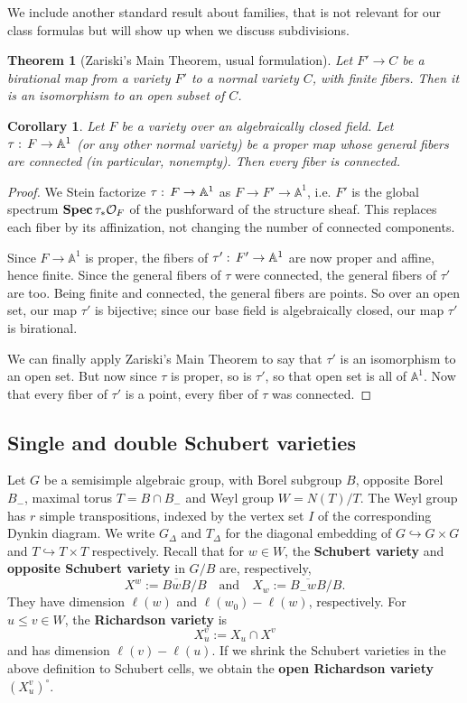 \documentclass[11pt]{amsart}
\newtheorem{theorem}[Thm]{Theorem}
\newtheorem{corollary}[Thm]{Corollary}
\theoremstyle{definition}
\newcommand\defn[1]{{\bf #1}}
\def\AA{{\mathbb A }}
\newcommand\calO{{\mathcal O}}
\renewcommand\AA{{\mathbb A}}
\renewcommand{\colon}{\mathrel{:}}
\renewcommand{\colon}{:\mkern\thinmuskip}
\begin{document}
We include another standard result about families, that is not relevant
for our class formulas but will show up when we discuss subdivisions.

\begin{theorem}[Zariski's Main Theorem, usual formulation]
  Let $F' \to C$ be a birational map from a variety $F'$ to a normal
  variety $C$, with finite fibers. Then it is an isomorphism to an open
  subset of $C$.
\end{theorem}

\begin{corollary}\label{cor:ZMT}
  Let $F$ be a variety over an algebraically closed field.
  Let $\tau\colon F \to \AA^1$ (or any other normal variety)
  be a proper map whose general fibers are
  connected (in particular, nonempty). Then {\em every} fiber is connected.
\end{corollary}

\begin{proof}
  We Stein factorize $\tau\colon F\to \AA^1$ as $F \to F' \to \AA^1$, i.e.
  $F'$ is the global spectrum ${\bf Spec}\, \tau_* \calO_F$ of the
  pushforward of the structure sheaf. This replaces each fiber by
  its affinization, not changing the number of connected components.

  Since $F\to \AA^1$ is proper,
  the fibers of $\tau'\colon F' \to \AA^1$ are now proper and affine,
  hence finite. Since the general fibers of $\tau$ were connected,
  the general fibers of $\tau'$ are too. Being finite and connected,
  the general fibers are points. So over an open set, our map $\tau'$
  is bijective; since our base field is algebraically closed,
  our map $\tau'$ is birational.

  We can finally apply Zariski's Main Theorem to say that $\tau'$ is
  an isomorphism to an open set. But now since $\tau$ is proper, so is
  $\tau'$, so that open set is all of $\AA^1$. Now that every fiber of
  $\tau'$ is a point, every fiber of $\tau$ was connected.
\end{proof}

\subsection{Single and double Schubert varieties} 

Let $G$ be a semisimple algebraic group, with Borel subgroup $B$, opposite Borel $B_-$, maximal torus $T =B \cap B_-$ and Weyl group $W=N(T)/T$. The Weyl group has $r$ simple transpositions, indexed by the vertex set $I$ of the corresponding Dynkin diagram. We write $G_{\Delta}$ and $T_{\Delta}$ for the diagonal embedding of $G \hookrightarrow G \times G$ and $T \hookrightarrow T \times T$ respectively.
 Recall that for $ w \in W$, the \defn{Schubert variety} and \defn{opposite Schubert variety} in $G/B$ are, respectively, 
\[X^w := \overline{BwB}/B \quad \text{and} \quad X_w := \overline{B_- w B}/B.\]
They have dimension $\ell(w)$ and $\ell(w_0)-\ell(w)$, respectively. For $u\leq  v \in W$, the \defn{Richardson variety} is 
\[X^v_u:= X_u \cap X^v\]
and has dimension $\ell(v)- \ell(u)$. If we shrink the Schubert varieties in the above definition to Schubert cells, we obtain the \defn{open Richardson variety} $(X^v_u)^\circ$.
\end{document}
